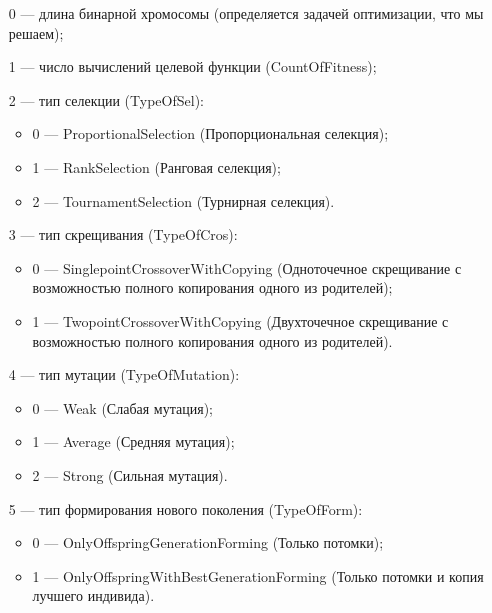 \documentclass[a4paper,12pt]{article}
\begin{document}
 \begin{itemize}
 \item [0] --- длина бинарной хромосомы (определяется задачей оптимизации, что мы решаем);
 
 \item [1] --- число вычислений целевой функции (CountOfFitness);
 
 \item [2] --- тип селекции (TypeOfSel):
 
 \begin{itemize}
       \item 0 --- ProportionalSelection (Пропорциональная селекция);
 
       \item 1 --- RankSelection (Ранговая селекция);
 
       \item 2 --- TournamentSelection (Турнирная селекция).
	    \end{itemize}
 
 \item [3] --- тип скрещивания (TypeOfCros):
  \begin{itemize}
       \item 0 --- SinglepointCrossoverWithCopying (Одноточечное скрещивание с возможностью полного копирования одного из родителей);
 
       \item 1 --- TwopointCrossoverWithCopying (Двухточечное скрещивание с возможностью полного копирования одного из родителей).
	    \end{itemize}
 
 \item [4] --- тип мутации (TypeOfMutation):
  \begin{itemize}
       \item 0 --- Weak (Слабая мутация);
 
       \item 1 --- Average (Средняя мутация);
 
       \item 2 --- Strong (Сильная мутация).
	    \end{itemize}
 
 \item [5] --- тип формирования нового поколения (TypeOfForm):
  \begin{itemize}
       \item 0 --- OnlyOffspringGenerationForming (Только потомки);
 
       \item 1 --- OnlyOffspringWithBestGenerationForming (Только потомки и копия лучшего индивида).
	    \end{itemize}
 \end{itemize}
 
\end{document}
